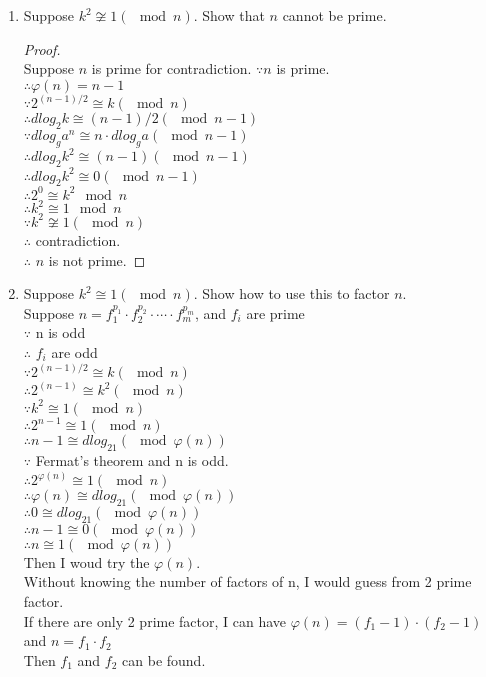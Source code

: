 \documentclass[paper=a4, fontsize=11pt]{scrartcl} %
\numberwithin{equation}{section} %
\numberwithin{figure}{section} %
\newcommand{\pnl}{$ $\newline\\}
\begin{document}
\begin{enumerate}
\item Suppose $k^2 \not\cong 1 (\mod n)$. Show that $n$ cannot be prime.
\begin{proof}
\pnl
Suppose $n$ is prime for contradiction.
$\because n$ is prime.\\
$\therefore \varphi(n) = n-1$\\
$\because 2^{(n-1)/2} \cong k (\mod n)$\\
$\therefore dlog_2k \cong (n-1)/2 (\mod n-1)$\\
$\because dlog_ga^n \cong n\cdot dlog_ga(\mod n-1)$\\
$\therefore dlog_2k^2 \cong (n-1) (\mod n-1)$\\
$\therefore dlog_2k^2 \cong 0 (\mod n-1)$\\
$\therefore 2^0 \cong k^2 \mod n$\\
$\therefore k^2 \cong 1 \mod n$\\
$\because k^2 \not\cong 1 (\mod n)$\\
$\therefore$ contradiction.\\
$\therefore$ $n$ is not prime.

\end{proof}
\item Suppose $k^2 \cong 1 (\mod n)$. Show how to use this to factor $n$.\\
Suppose $n = f_1^{p_1} \cdot f_2^{p_2} \cdot \cdots \cdot f_m^{p_m}$, and $f_i$ are prime\\
$\because$ n is odd\\
$\therefore$ $f_i$ are odd\\
$\because 2^{(n-1)/2} \cong k (\mod n)$\\
$\therefore 2^{(n-1)} \cong k^2 (\mod n)$\\
$\because k^2 \cong 1 (\mod n)$\\
$\therefore 2^{n-1} \cong 1 (\mod n)$\\
$\therefore n-1 \cong dlog_21 (\mod \varphi(n))$\\
$\because$ Fermat's theorem and n is odd.\\
$\therefore 2^{\varphi(n)} \cong 1 (\mod n)$\\
$\therefore \varphi(n) \cong dlog_21 (\mod \varphi(n))$\\
$\therefore 0 \cong dlog_21 (\mod \varphi(n))$\\
$\therefore n-1 \cong 0 (\mod \varphi(n))$\\
$\therefore n \cong 1 (\mod \varphi(n))$\\
Then I woud try the $\varphi(n)$.\\
Without knowing the number of factors of n, I would guess from 2 prime factor.\\
If there are only 2 prime factor, I can have $\varphi(n) = (f_1 - 1) \cdot (f_2 - 1)$\\
and $n = f_1 \cdot f_2$\\
Then $f_1$ and $f_2$ can be found.\\
\end{enumerate}

\end{document}
